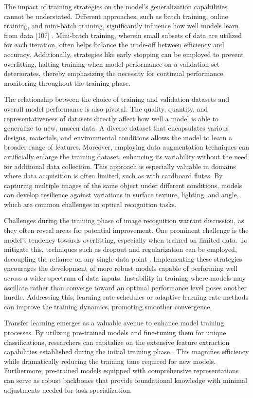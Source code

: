 The impact of training strategies on the model's generalization capabilities cannot be understated. Different approaches, such as batch training, online training, and mini-batch training, significantly influence how well models learn from data [107] \cite{bottou2012sgd}. Mini-batch training, wherein small subsets of data are utilized for each iteration, often helps balance the trade-off between efficiency and accuracy. Additionally, strategies like early stopping can be employed to prevent overfitting, halting training when model performance on a validation set deteriorates, thereby emphasizing the necessity for continual performance monitoring throughout the training phase.


The relationship between the choice of training and validation datasets and overall model performance is also pivotal. The quality, quantity, and representativeness of datasets directly affect how well a model is able to generalize to new, unseen data. A diverse dataset that encapsulates various designs, materials, and environmental conditions allows the model to learn a broader range of features. Moreover, employing data augmentation techniques can artificially enlarge the training dataset, enhancing its variability without the need for additional data collection. This approach is especially valuable in domains where data acquisition is often limited, such as with cardboard flutes. By capturing multiple images of the same object under different conditions, models can develop resilience against variations in surface texture, lighting, and angle, which are common challenges in optical recognition tasks.


Challenges during the training phase of image recognition warrant discussion, as they often reveal areas for potential improvement. One prominent challenge is the model's tendency towards overfitting, especially when trained on limited data. To mitigate this, techniques such as dropout and regularization can be employed, decoupling the reliance on any single data point \cite{srivastava2014dropout}. Implementing these strategies encourages the development of more robust models capable of performing well across a wider spectrum of data inputs. Instability in training where models may oscillate rather than converge toward an optimal performance level poses another hurdle. Addressing this, learning rate schedules or adaptive learning rate methods can improve the training dynamics, promoting smoother convergence.


Transfer learning emerges as a valuable avenue to enhance model training processes. By utilizing pre-trained models and fine-tuning them for unique classifications, researchers can capitalize on the extensive feature extraction capabilities established during the initial training phase \cite{pan2010survey}. This magnifies efficiency while dramatically reducing the training time required for new models. Furthermore, pre-trained models equipped with comprehensive representations can serve as robust backbones that provide foundational knowledge with minimal adjustments needed for task specialization.



